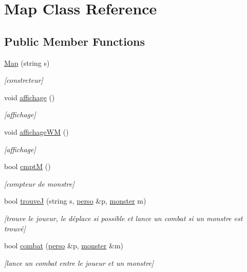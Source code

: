 \hypertarget{class_map}{}\section{Map Class Reference}
\label{class_map}
\subsection*{Public Member Functions}
\begin{DoxyCompactItemize}
\item 
\hyperlink{class_map_a264307e95b5c08da0b21ee3927f30a79}{Map} (string s)
\begin{DoxyCompactList}\small\item\em \mbox{[}constrcteur\mbox{]} \end{DoxyCompactList}\item 
void \hyperlink{class_map_a3426a949e89c1808e2a359fb125635ac}{affichage} ()
\begin{DoxyCompactList}\small\item\em \mbox{[}affichage\mbox{]} \end{DoxyCompactList}\item 
void \hyperlink{class_map_a1405dd0cf769dc6b37a44c68c27e57b8}{affichage\+WM} ()
\begin{DoxyCompactList}\small\item\em \mbox{[}affichage\mbox{]} \end{DoxyCompactList}\item 
bool \hyperlink{class_map_a7744f9a658937dbbe1b0d35ae6a56a95}{cmptM} ()
\begin{DoxyCompactList}\small\item\em \mbox{[}compteur de monstre\mbox{]} \end{DoxyCompactList}\item 
bool \hyperlink{class_map_a1576b661d68bb5cc9d417be9623349d8}{trouveJ} (string s, \hyperlink{classperso}{perso} \&p, \hyperlink{classmonster}{monster} m)
\begin{DoxyCompactList}\small\item\em \mbox{[}trouve le joueur, le déplace si possible et lance un combat si un monstre est trouvé\mbox{]} \end{DoxyCompactList}\item 
bool \hyperlink{class_map_aefa80595b7927f25a5d40684d4db2b4e}{combat} (\hyperlink{classperso}{perso} \&p, \hyperlink{classmonster}{monster} \&m)
\begin{DoxyCompactList}\small\item\em \mbox{[}lance un combat entre le joueur et un monstre\mbox{]} \end{DoxyCompactList}\end{DoxyCompactItemize}
